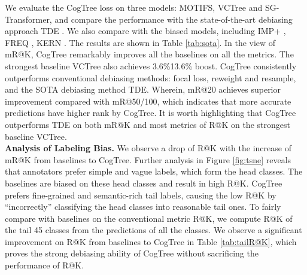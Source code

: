 \documentclass{article}
\begin{document}
We evaluate the CogTree loss 
on three models: MOTIFS, VCTree and SG-Transformer, and compare the performance with the state-of-the-art debiasing approach TDE \cite{Tang2020Unbiased}. We also compare with the biased models, including IMP+ \cite{xu2017scene}, FREQ \cite{zellers2018neural}, KERN \cite{chen2019knowledge}. The results are shown in Table \ref{tab:sota}. In the view of mR@K, CogTree remarkably improves all the baselines on all the metrics. The strongest baseline VCTree also achieves 3.6\%13.6\% boost. CogTree consistently outperforms conventional debiasing methods: focal loss, reweight and resample, and the SOTA debiasing method TDE. Wherein, mR@20 achieves superior improvement compared with mR@50/100, which indicates that more accurate predictions have higher rank by CogTree. It is worth highlighting that CogTree outperforms TDE on both mR@K and most metrics of R@K on the strongest baseline VCTree.  \\
\textbf{Analysis of Labeling Bias. } We observe a drop of R@K  with the increase of mR@K from baselines to CogTree. Further analysis in Figure \ref{fig:tsne} reveals that annotators prefer simple and vague labels, which form the head classes. The baselines are biased on these head classes and result in high R@K.
CogTree prefers fine-grained and semantic-rich tail labels, causing the low R@K by ``incorrectly'' classifying the head classes into reasonable tail ones. To fairly compare with baselines on the conventional metric R@K, we compute R@K of the tail 45 classes from the predictions of all the classes. We observe a significant improvement on R@K from baselines to CogTree in Table \ref{tab:tailR@K}, which proves the strong debiasing ability of CogTree without sacrificing the performance of R@K.



\iffalse
\begin{figure}[t]
    \centering
    \texttt{[image: Figure5.pdf]}
    \caption{R@100 of the most frequent 35 classes on PredCls.}
    \label{fig:recall}
\end{figure}
\fi
\end{document}
